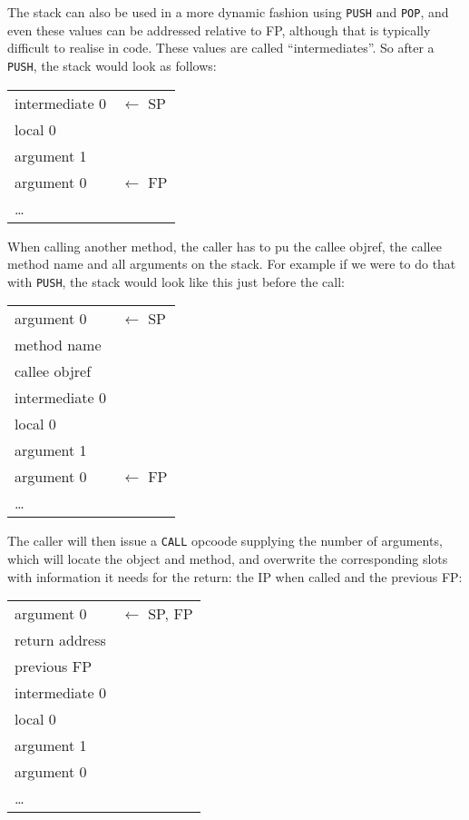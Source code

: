 \documentclass[12pt,a4paper]{article}
\begin{document}
The stack can also be used in a more dynamic fashion using \verb|PUSH| and \verb|POP|, and even these values can be addressed relative to FP, although that is typically difficult to realise in code. These values are called ``intermediates''. So after a \verb|PUSH|, the stack would look as follows:

\begin{table}[h]
\centering
\begin{tabular}{|p{3cm}|p{3cm}}
intermediate 0 & $\leftarrow$ SP \\
local 0    \\    
argument 1 \\
argument 0 & $\leftarrow$ FP \\ 
\cline{1-1}
\ldots & \\
\end{tabular}
\end{table}

When calling another method, the caller has to pu the callee objref, the callee method name and all arguments on the stack. For example if we were to do that with \verb|PUSH|, the stack would look like this just before the call:

\begin{table}[h]
\centering
\begin{tabular}{|p{3cm}|p{3cm}}
argument 0 & $\leftarrow$ SP \\
method name \\
callee objref \\
intermediate 0 \\
local 0    \\    
argument 1 \\
argument 0 & $\leftarrow$ FP \\ 
\cline{1-1}
\ldots & \\
\end{tabular}
\end{table}

The caller will then issue a \verb|CALL| opcoode supplying the number of arguments, which will locate the object and method, and overwrite the corresponding slots with information it needs for the return: the IP when called and the previous FP:

\begin{table}[h]
\centering
\begin{tabular}{|p{3cm}|p{3cm}}
argument 0 & $\leftarrow$ SP, FP \\
\cline{1-1}
return address \\
previous FP \\
intermediate 0 \\
local 0    \\    
argument 1 \\
argument 0 \\
\cline{1-1}
\ldots & \\
\end{tabular}
\end{table}
\end{document}
